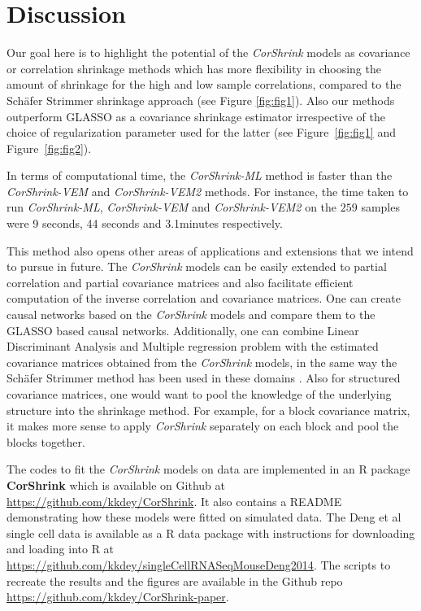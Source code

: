 \section{Discussion}
 
Our goal here is to highlight the potential of the \textit{CorShrink} models as covariance or correlation shrinkage methods which has more flexibility in choosing the amount of shrinkage for the high and low sample correlations, compared to the 
Sch\"{a}fer Strimmer shrinkage approach (see Figure \ref{fig:fig1}). Also our methods outperform GLASSO as a covariance shrinkage estimator  irrespective of the choice of regularization parameter used for the latter (see Figure~\ref{fig:fig1} and Figure~\ref{fig:fig2}). 

In terms of computational time, the \textit{CorShrink-ML} method is faster than the  \textit{CorShrink-VEM} and \textit{CorShrink-VEM2} methods. For instance, the time taken to run \textit{CorShrink-ML}, \textit{CorShrink-VEM} and \textit{CorShrink-VEM2} on the $259$ samples were  9 seconds,  44 seconds  and 3.1minutes  
respectively.

This method also opens other areas of applications and extensions that we intend to pursue in future. The \textit{CorShrink} models can be easily extended to partial correlation and partial covariance matrices and also facilitate efficient computation of the inverse correlation and covariance matrices. One can create causal networks based on the \textit{CorShrink} models and compare them to the GLASSO based causal networks. Additionally, one can combine Linear Discriminant Analysis and  Multiple regression problem with the estimated covariance matrices obtained from the \textit{CorShrink} models, in the same way the Sch\"{a}fer Strimmer method has been used in these domains \cite{Xu2009} \cite{Schafer2005}. Also for structured covariance matrices, one would want to pool the knowledge of the underlying structure into the shrinkage method. For example, for a block covariance matrix, it makes more sense to apply \textit{CorShrink} separately on each block and pool the blocks together. 

The codes to fit the \textit{CorShrink} models on data are implemented in an R package \textbf{CorShrink} which is available on Github at \url{https://github.com/kkdey/CorShrink}. It also contains a README demonstrating how these models were fitted on simulated data. The Deng et al single cell data \cite{Deng2014} is available as a R data package with instructions for downloading and loading into R at \url{https://github.com/kkdey/singleCellRNASeqMouseDeng2014}.
The scripts to recreate the results and the figures are available in the Github repo \url{https://github.com/kkdey/CorShrink-paper}. 

